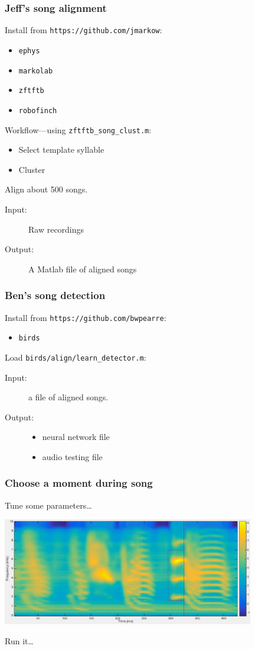 \documentclass{beamer}
\begin{document}
\begin{frame}
  \frametitle{Jeff's song alignment}
  Install from {\tt https://github.com/jmarkow}:
  \begin{itemize}
    \item {\tt ephys}
    \item {\tt markolab}
    \item {\tt zftftb}
    \item {\tt robofinch}
  \end{itemize}
  Workflow---using {\tt zftftb\_song\_clust.m}:
  \begin{itemize}
    \item Select template syllable
    \item Cluster
  \end{itemize}

  \noindent Align about 500 songs.
  \begin{description}
    \item[Input:] Raw recordings
    \item[Output:] A Matlab file of aligned songs
  \end{description}
\end{frame}

\begin{frame}
  \frametitle{Ben's song detection}
  Install from {\tt https://github.com/bwpearre}:
  \begin{itemize}
    \item {\tt birds}
  \end{itemize}
  Load {\tt birds/align/learn\_detector.m}:

  \begin{description}
    \item[Input:] a file of aligned songs.
    \item[Output:]
      \begin{itemize}
      \item neural network file
      \item audio testing file
      \end{itemize}
  \end{description}
      
\end{frame}

\begin{frame}
  \frametitle{Choose a moment during song}
  Tune some parameters\dots

  \includegraphics[width=11cm]{song-spectrogram-with-alignment-1}

  Run it\dots
\end{frame}
\end{document}
